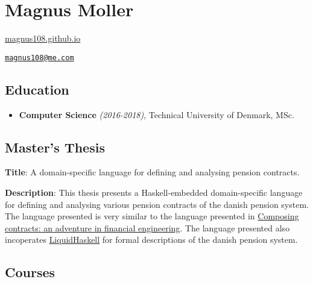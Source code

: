 \documentclass{article}
\providecommand{\tightlist}{%
  \setlength{\itemsep}{0pt}\setlength{\parskip}{0pt}}
\begin{document}
\hypertarget{magnus-moller}{%
\section{Magnus Moller}\label{magnus-moller}}

\href{https://magnus108.github.io/}{magnus108.github.io}

\href{mailto:magnus108@me.com}{\nolinkurl{magnus108@me.com}}

\hypertarget{education}{%
\subsection{Education}\label{education}}

\begin{itemize}
\tightlist
\item
  \textbf{Computer Science} \emph{(2016-2018)}, Technical University of
  Denmark, MSc.
\end{itemize}

\hypertarget{masters-thesis}{%
\subsection{Master’s Thesis}\label{masters-thesis}}

\textbf{Title}: A domain-specific language for defining and analysing
pension contracts.

\textbf{Description}: This thesis presents a Haskell-embedded
domain-specific language for defining and analysing various pension
contracts of the danish pension system. The language presented is very
similar to the language presented in
\href{https://www.microsoft.com/en-us/research/wp-content/uploads/2016/07/contracts-icfp.pdf}{Composing
contracts: an adventure in financial engineering}. The language
presented also incoperates
\href{https://ucsd-progsys.github.io/liquidhaskell-blog/}{LiquidHaskell}
for formal descriptions of the danish pension system.

\hypertarget{courses}{%
\subsection{Courses}\label{courses}}
\end{document}
